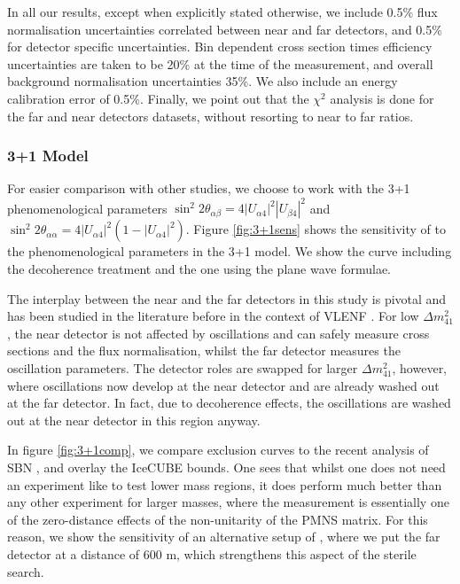 In all our results, except when explicitly stated otherwise, we include 0.5\% flux normalisation uncertainties correlated between near and far detectors, and 0.5\% for detector specific uncertainties. Bin dependent cross section times efficiency uncertainties are taken to be 20\% at the time of the measurement, and overall background normalisation uncertainties 35\%. We also include an energy calibration error of 0.5\%. Finally, we point out that the $\chi^2$ analysis is done for the far and near detectors datasets, without resorting to near to far ratios.
 
\subsubsection{3+1 Model}

For easier comparison with other studies, we choose to work with the 3+1 phenomenological parameters $\sin^2{2 \theta_{\alpha \beta}} = 4 |U_{\alpha 4}|^2|U_{\beta 4}|^2$ and $\sin^2{2 \theta_{\alpha \alpha}} = 4|U_{\alpha 4}|^2(1 - |U_{\alpha 4}|^2)$. Figure \ref{fig:3+1sens} shows the sensitivity of \nus to the phenomenological parameters in the 3+1 model. We show the curve including the decoherence treatment and the one using the plane wave formulae. 

The interplay between the near and the far detectors in this study is pivotal and has been studied in the literature before in the context of VLENF \cite{Winter2012a}. For low $\Delta m^2_{41}$, the near detector is not affected by oscillations and can safely measure cross sections and the flux normalisation, whilst the far detector measures the oscillation parameters. The detector roles are swapped for larger $\Delta m^2_{41}$, however, where oscillations now develop at the near detector and are already washed out at the far detector. In fact, due to decoherence effects, the oscillations are washed out at the near detector in this region anyway. 


In figure \ref{fig:3+1comp}, we compare \nus exclusion curves to the recent analysis of SBN \cite{Cianci2017}, and overlay the IceCUBE bounds\cite{TheIceCubeCollaboration2016}. One sees that whilst one does not need an experiment like \nus to test lower mass regions, it does perform much better than any other experiment for larger masses, where the measurement is essentially one of the zero-distance effects of the non-unitarity of the PMNS matrix. For this reason, we show the sensitivity of an alternative setup of \nus, where we put the far detector at a distance of $600$ m, which strengthens this aspect of the sterile search. 

